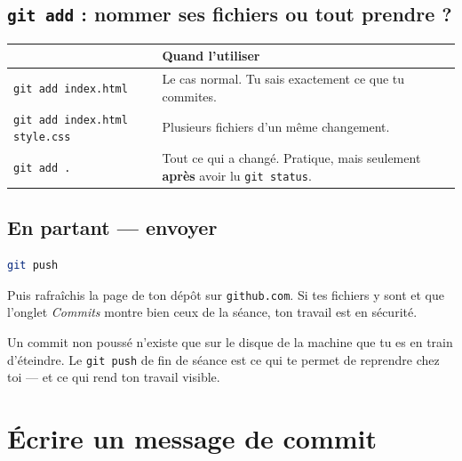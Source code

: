 \documentclass[a4paper,11pt]{article}
\newcommand{\hdr}[1]{\multicolumn{1}{l}{\color{white}\bfseries #1}}
\renewcommand{\arraystretch}{1.3}
\begin{document}
\subsection{\texttt{git add} : nommer ses fichiers ou tout prendre ?}

\begin{center}
\renewcommand{\arraystretch}{1.1}
\begin{tabularx}{\linewidth}{p{4.4cm}X}
  \toprule
  \rowcolor{uniNavy}
  \hdr{Commande} & \hdr{Quand l'utiliser} \\
  \midrule
  \rowcolor{uniPaper}
  \texttt{git add index.html} & Le cas normal. Tu sais exactement ce que tu commites. \\
  \texttt{git add index.html style.css} & Plusieurs fichiers d'un même changement. \\
  \rowcolor{uniPaper}
  \texttt{git add .} & Tout ce qui a changé. Pratique, mais seulement \textbf{après} avoir lu \texttt{git status}. \\
  \bottomrule
\end{tabularx}
\end{center}

\subsection{En partant --- envoyer}

\begin{lstlisting}[language=bash]
git push
\end{lstlisting}

Puis rafraîchis la page de ton dépôt sur \texttt{github.com}. Si tes fichiers y sont et que l'onglet \textit{Commits} montre bien ceux de la séance, ton travail est en sécurité.

\begin{tcolorbox}[attention, title={Ne quitte jamais la salle sans avoir poussé}]
Un commit non poussé n'existe que sur le disque de la machine que tu es en train d'éteindre. Le \texttt{git push} de fin de séance est ce qui te permet de reprendre chez toi --- et ce qui rend ton travail visible.
\end{tcolorbox}

\section{Écrire un message de commit}
\end{document}

